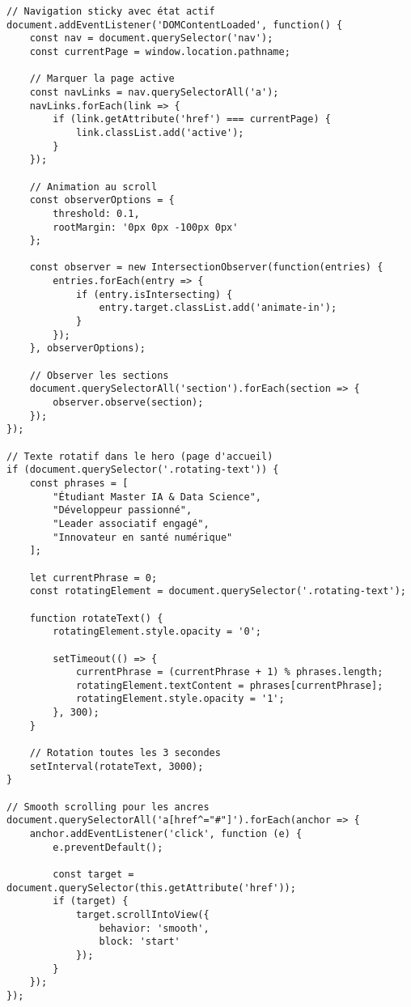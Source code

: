 \documentclass[12pt,a4paper]{article}
\begin{document}
\begin{lstlisting}[style=jsstyle, caption=JavaScript principal (script.js)]
// Navigation sticky avec état actif
document.addEventListener('DOMContentLoaded', function() {
    const nav = document.querySelector('nav');
    const currentPage = window.location.pathname;
    
    // Marquer la page active
    const navLinks = nav.querySelectorAll('a');
    navLinks.forEach(link => {
        if (link.getAttribute('href') === currentPage) {
            link.classList.add('active');
        }
    });
    
    // Animation au scroll
    const observerOptions = {
        threshold: 0.1,
        rootMargin: '0px 0px -100px 0px'
    };
    
    const observer = new IntersectionObserver(function(entries) {
        entries.forEach(entry => {
            if (entry.isIntersecting) {
                entry.target.classList.add('animate-in');
            }
        });
    }, observerOptions);
    
    // Observer les sections
    document.querySelectorAll('section').forEach(section => {
        observer.observe(section);
    });
});

// Texte rotatif dans le hero (page d'accueil)
if (document.querySelector('.rotating-text')) {
    const phrases = [
        "Étudiant Master IA & Data Science",
        "Développeur passionné",
        "Leader associatif engagé",
        "Innovateur en santé numérique"
    ];
    
    let currentPhrase = 0;
    const rotatingElement = document.querySelector('.rotating-text');
    
    function rotateText() {
        rotatingElement.style.opacity = '0';
        
        setTimeout(() => {
            currentPhrase = (currentPhrase + 1) % phrases.length;
            rotatingElement.textContent = phrases[currentPhrase];
            rotatingElement.style.opacity = '1';
        }, 300);
    }
    
    // Rotation toutes les 3 secondes
    setInterval(rotateText, 3000);
}

// Smooth scrolling pour les ancres
document.querySelectorAll('a[href^="#"]').forEach(anchor => {
    anchor.addEventListener('click', function (e) {
        e.preventDefault();
        
        const target = document.querySelector(this.getAttribute('href'));
        if (target) {
            target.scrollIntoView({
                behavior: 'smooth',
                block: 'start'
            });
        }
    });
});
\end{lstlisting}
\end{document}
